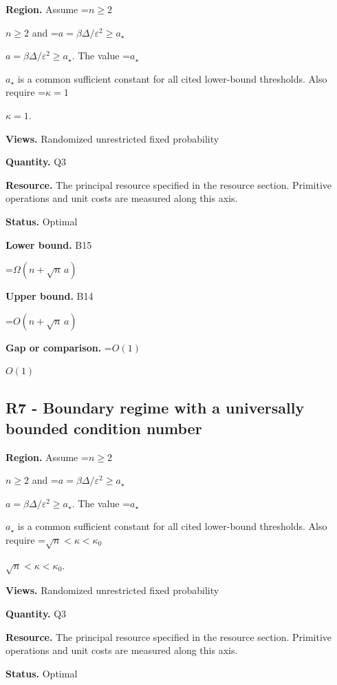 \documentclass[10pt,a4paper]{article}
\newcommand{\AtlasMath}[1]{\par\begingroup\centering\setbox0=\hbox{$\displaystyle #1$}\ifdim\wd0>1.4\linewidth\typeout{ATLAS WIDE FORMULA: \the\wd0}\fi\ifdim\wd0>\linewidth\resizebox{\linewidth}{!}{\box0}\else\box0\fi\par\endgroup}
\newcommand{\AtlasInlineMath}[1]{\begingroup\setbox0=\hbox{$#1$}\ifdim\wd0>.4\linewidth\endgroup\AtlasMath{#1}\else\endgroup$#1$\fi}
\begin{document}
\textbf{Region.} Assume \AtlasInlineMath{n\ge2} and \AtlasInlineMath{a=\beta\Delta/\varepsilon^2\ge a_\star}. The value \AtlasInlineMath{a_\star} is a common sufficient constant for all cited lower-bound thresholds. Also require \AtlasInlineMath{\kappa=1}.



\textbf{Views.} Randomized unrestricted fixed probability



\textbf{Quantity.} Q3



\textbf{Resource.} The principal resource specified in the resource section. Primitive operations and unit costs are measured along this axis.



\textbf{Status.} Optimal



\textbf{Lower bound.} B15



\AtlasMath{\Omega(n+\sqrt n\,a)}


\textbf{Upper bound.} B14



\AtlasMath{O(n+\sqrt n\,a)}


\textbf{Gap or comparison.} \AtlasInlineMath{O(1)}



\subsection{R7 - Boundary regime with a universally bounded condition number}


\textbf{Region.} Assume \AtlasInlineMath{n\ge2} and \AtlasInlineMath{a=\beta\Delta/\varepsilon^2\ge a_\star}. The value \AtlasInlineMath{a_\star} is a common sufficient constant for all cited lower-bound thresholds. Also require \AtlasInlineMath{\sqrt n<\kappa<\kappa_0}.



\textbf{Views.} Randomized unrestricted fixed probability



\textbf{Quantity.} Q3



\textbf{Resource.} The principal resource specified in the resource section. Primitive operations and unit costs are measured along this axis.



\textbf{Status.} Optimal
\end{document}
